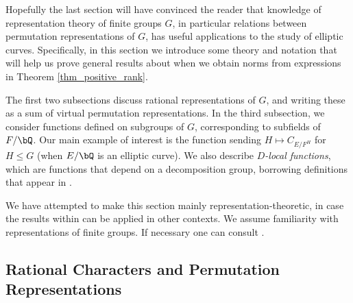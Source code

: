 Hopefully the last section will have convinced the reader that knowledge of representation theory of finite groups $G$, in particular relations between permutation representations of $G$, has useful applications to the study of elliptic curves.  Specifically, in this section we introduce some theory and notation that will  help us prove general results about when we obtain norms from expressions in Theorem \ref{thm_positive_rank}. 

The first two subsections discuss rational representations of $G$, and writing these as a sum of virtual permutation representations.
In the third subsection, we consider functions defined on subgroups of $G$, corresponding to subfields of $F / \bQ$. Our main example of interest is the function sending $H \mapsto C_{E / F^H}$ for $H \leq G$ (when $E / \bQ$ is an elliptic curve). We also describe \textit{$D$-local functions}, which are functions that depend on a decomposition group, borrowing definitions that appear in \cite[Section 2.iii]{reg-const}.

We have attempted to make this section mainly representation-theoretic, in case the results within can be applied in other contexts. We assume familiarity with representations of finite groups. If necessary one can consult \cite{Serre}.

\subsection{Rational Characters and Permutation Representations}\label{rep}


